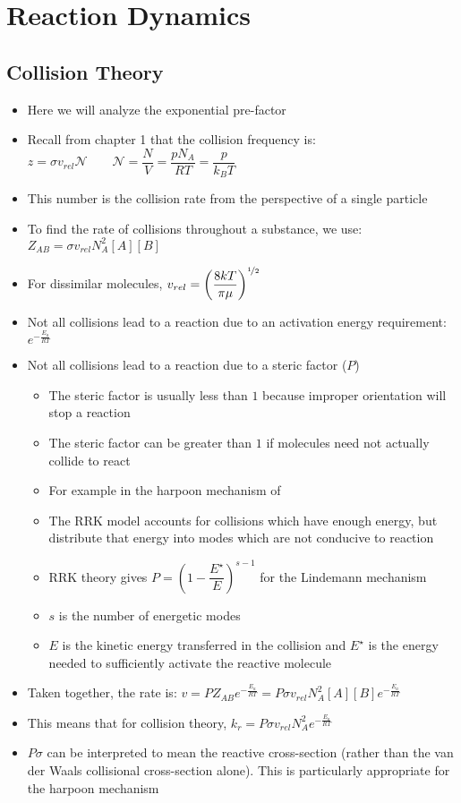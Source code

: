 \documentclass[12pt, openany, letterpaper]{memoir}
\begin{document}
\chapter{Reaction Dynamics}
\section{Collision Theory}
\begin{itemize}
	\item Here we will analyze the exponential pre-factor
	\item Recall from chapter 1 that the collision frequency is: $z=\sigma v_{rel}\mathcal{N}\hspace{2em}\mathcal{N} = \dfrac{N}{V} = \dfrac{pN_A}{RT} = \dfrac{p}{k_BT}$
	\item This number is the collision rate from the perspective of a single particle
	\item To find the rate of collisions throughout a substance, we use: $Z_{AB}=\sigma v_{rel}N_A^2[A][B]$
	\item For dissimilar molecules, $v_{rel}=\left(\dfrac{8kT}{\pi\mu}\right)^{\nicefrac{1}{2}}$
	\item Not all collisions lead to a reaction due to an activation energy requirement: $e^{-\frac{E_a}{RT}}$
	\item Not all collisions lead to a reaction due to a steric factor ($P$)
	\begin{itemize}
		\item The steric factor is usually less than $1$ because improper orientation will stop a reaction
		\item The steric factor can be greater than $1$ if molecules need not actually collide to react
		\item For example in the harpoon mechanism of 
		\item The RRK model accounts for collisions which have enough energy, but distribute that energy into modes which are not conducive to reaction
		\item RRK theory gives $P=\left(1-\dfrac{E^{\star}}{E}\right)^{s-1}$ for the Lindemann mechanism
		\item $s$ is the number of energetic modes
		\item $E$ is the kinetic energy transferred in the collision and $E^{\star}$ is the energy needed to sufficiently activate the reactive molecule 
	\end{itemize}
	\item Taken together, the rate is: $v=PZ_{AB}e^{-\frac{E_a}{RT}} = P\sigma v_{rel}N_A^2[A][B]e^{-\frac{E_a}{RT}}$
	\item This means that for collision theory, $k_r=P\sigma v_{rel}N_A^2e^{-\frac{E_a}{RT}}$
	\item $P\sigma$ can be interpreted to mean the reactive cross-section (rather than the van der Waals collisional cross-section alone). This is particularly appropriate for the harpoon mechanism
\end{itemize}
\end{document}
